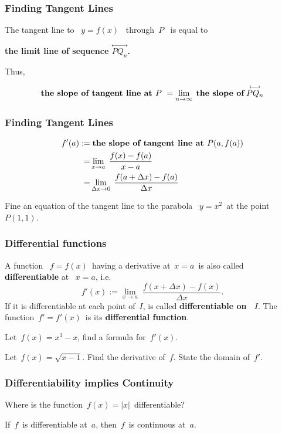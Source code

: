  \begin{frame}[fragile] \frametitle{Finding Tangent Lines}

The tangent line to \ $y=f(x)$ \ through\ $P$ \ is equal to \\
 \begin{center}
  {\bf the limit line of sequence { $\overset{\longleftrightarrow}{PQ_n}$. }}
 \end{center}

Thus,

\[ \text{\bf the slope of tangent line at\ $P$} \ = \lim_{n\to \infty} \; { \text{\bf the slope of} \; \overset{\longleftrightarrow}{PQ_n}}\]

\end{frame}

 \begin{frame}[fragile] \frametitle{Finding Tangent Lines}
\begin{align*}
 f'(a) :=& \;\text{\bf the slope of tangent line at\ $P(a,f(a))$}\\
 =& \lim_{x \to a}\; \frac{f(x)-f(a)}{x-a} \\
 =& \lim_{\Delta x \to 0}\; \frac{f(a+\Delta x)-f(a)}{\Delta x}
\end{align*}

Fine an equation of the tangent line to the parabola \ $y=x^2$\ at the point\ $P(1,1)$.
\end{frame}

 \begin{frame}[fragile] \frametitle{Differential functions}
A function \ $f=f(x)$\ having a derivative at\ $x=a$\ is also called {\bf differentiable} at \ $x=a$, i.e.
{\[f'(x) := \lim_{x\to a} \; \frac{f(x+\Delta x)-f(x)}{\Delta x} .\]}
 If it is differentiable at each point of\ $I$, is called {\bf differentiable on \ $I$}. 
The function\ $f' = f'(x)$\ is its {\bf differential function}.

Let\ $f(x)=x^3-x$, find a formula for\ $f'(x)$.

Let\ $f(x)=\sqrt{x-1}$. Find the derivative of\ $f$. State the domain of\ $f'$.

\end{frame}

 \begin{frame}[fragile] \frametitle{Differentiability implies Continuity}

	Where is the function\ $f(x)=|x|$\ differentiable?

If\ $f$\ is differentiable at\ $a$, then\ $f$\ is continuous at\ $a$.

\end{frame}


